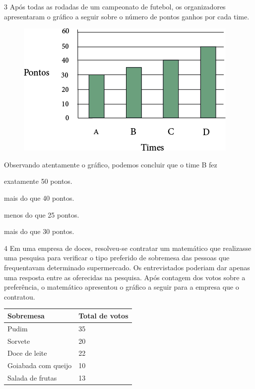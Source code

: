 \num{3} Após todas as rodadas de um campeonato de futebol, os organizadores
apresentaram o gráfico a seguir sobre o número de pontos ganhos por cada
time.

\begin{figure}[htpb!]
\centering
\includegraphics[width=.9\textwidth]{media/image43.png}
\end{figure}

Observando atentamente o gráfico, podemos concluir que o time B fez

\begin{escolha}
\item
  exatamente 50 pontos.
\item
  mais do que 40 pontos.
\item
  menos do que 25 pontos.
\item
  mais do que 30 pontos.
\end{escolha}


\num{4} Em uma empresa de doces, resolveu-se contratar um matemático que realizasse uma
pesquisa para verificar o tipo preferido de sobremesa das pessoas que
frequentavam determinado supermercado. Os entrevistados poderiam dar
apenas uma resposta entre as oferecidas na pesquisa. Após contagem dos
votos sobre a preferência, o matemático apresentou o gráfico a seguir
para a empresa que o contratou.

\begin{longtable}[]{@{}ll@{}}
\toprule
Sobremesa & Total de votos\tabularnewline
\midrule
\endhead
Pudim & 35\tabularnewline
Sorvete & 20\tabularnewline
Doce de leite & 22\tabularnewline
Goiabada com queijo & 10\tabularnewline
Salada de frutas & 13\tabularnewline
\bottomrule
\end{longtable}

